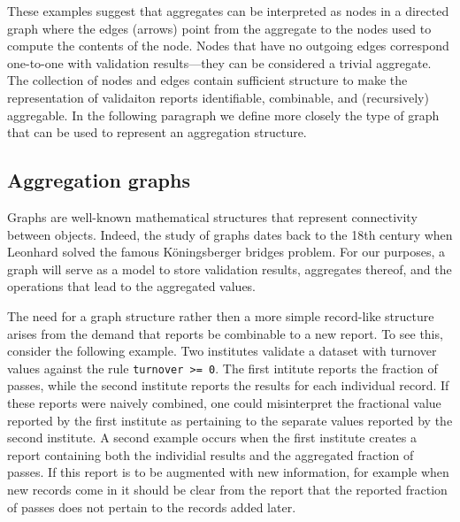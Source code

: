 \documentclass[a4paper, 11pt,titlepage]{article}
\newcommand{\code}[1]{\texttt{#1}}
\begin{document}
These examples suggest that aggregates can be interpreted as nodes in a
directed graph where the edges (arrows) point from the aggregate to the nodes
used to compute the contents of the node. Nodes that have no outgoing edges
correspond one-to-one with validation results---they can be considered a
trivial aggregate. The collection of nodes and edges contain sufficient
structure to make the representation of validaiton reports identifiable,
combinable, and (recursively) aggregable. In the following paragraph we define
more closely the type of graph that can be used to represent an aggregation
structure.


\subsection{Aggregation graphs}
\label{sect:aggregationgraphs}
Graphs are well-known mathematical structures that represent connectivity
between objects. Indeed, the  study of graphs dates back to the 18th century
when Leonhard \citet{euler1741solutio} solved the famous K\"oningsberger
bridges problem.  For our purposes, a graph will serve as a model to store
validation results, aggregates thereof, and the operations that lead to the
aggregated values.

The need for a graph structure rather then a more simple record-like structure
arises from the demand that reports be combinable to a new report.  To see
this, consider the following example. Two institutes validate a dataset with
turnover values against the rule \code{turnover >= 0}. The first intitute
reports the fraction of passes, while the second institute reports the results
for each individual record. If these reports were naively combined, one could
misinterpret the fractional value reported by the first institute as pertaining
to the separate values reported by the second institute. A second example
occurs when the first institute creates a report containing both the individial
results and the aggregated fraction of passes. If this report is to be
augmented with new information, for example when new records come in it should
be clear from the report that the reported fraction of passes does not pertain
to the records added later.
\end{document}
